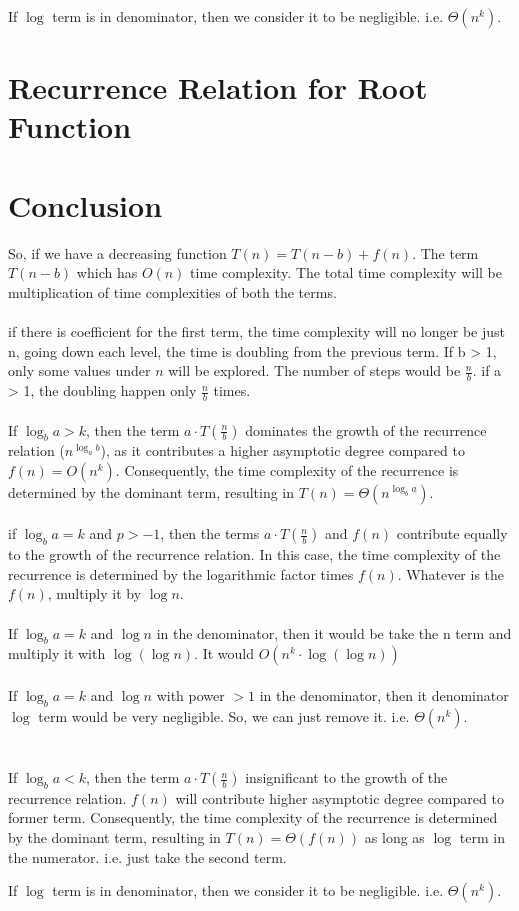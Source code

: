 \documentclass[]{article}
\theoremstyle{plain}
\theoremstyle{definition}
\begin{document}
If $\log$ term is in denominator, then we consider it to be negligible. i.e. $\Theta({n^k})$.

\section{Recurrence Relation for Root Function}



\section{Conclusion}
So, if we have a decreasing function $T(n) = T(n - b) + f(n)$. The term $T(n - b)$ which has $O(n)$ time complexity. The total time complexity will be multiplication of time complexities of both the terms. 
\\
\\
if there is coefficient for the first term, the time complexity will no longer be just n, going down each level, the time is doubling from the previous term. 
If b > 1, only some values under $n$ will be explored. The number of steps would be $\frac{n}{b}$. if a > 1, the doubling happen only $\frac{n}{b}$ times. 
\\
\\
If $\log_b{a} > k$, then the term $a \cdot T\left(\frac{n}{b}\right)$ dominates the growth of the recurrence relation ($n^{\log_a{b}}$), as it contributes a higher asymptotic degree compared to $f(n) = O(n^k)$. Consequently, the time complexity of the recurrence is determined by the dominant term, resulting in $T(n) = \Theta(n^{\log_b{a}})$.
\\
\\
if $\log_b{a} = k$ and $p > -1$, then the terms $a \cdot T\left(\frac{n}{b}\right)$ and $f(n)$ contribute equally to the growth of the recurrence relation. In this case, the time complexity of the recurrence is determined by the logarithmic factor times $f(n)$. Whatever is the $f(n)$, multiply it by $\log{n}$.
\\
\\
If $\log_b{a} = k$ and $\log{n}$ in the denominator, then it would be take the n term and multiply it with $\log{(\log{n})}$. It would $O(n^k \cdot \log{(\log{n})})$
\\
\\
If $\log_b{a} = k$ and $\log{n}$ with power $> 1$ in the denominator, then it denominator $\log$ term would be very negligible. So, we can just remove it. i.e. $\Theta(n^k)$.
\\
\\
\\
If $\log_b{a} < k$, then the term $a \cdot T\left(\frac{n}{b}\right)$ insignificant to the growth of the recurrence relation. $f(n)$ will contribute higher asymptotic degree compared to former term. Consequently, the time complexity of the recurrence is determined by the dominant term, resulting in $T(n) = \Theta(f(n))$ as long as $\log$ term in the numerator. i.e. just take the second term. 

If $\log$ term is in denominator, then we consider it to be negligible. i.e. $\Theta({n^k})$.
\end{document}
